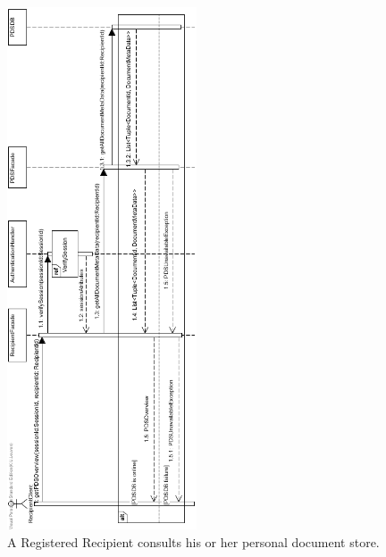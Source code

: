\documentclass[a4paper,10pt]{article}
\begin{document}
\begin{figure}[!htp]
    \centering
    \includegraphics[width=0.5\textwidth]{ConsultPDS.png}
    \caption{A Registered Recipient consults his or her personal document store.
        }\label{fig:seq_ConsultPDS}
\end{figure}
\end{document}
